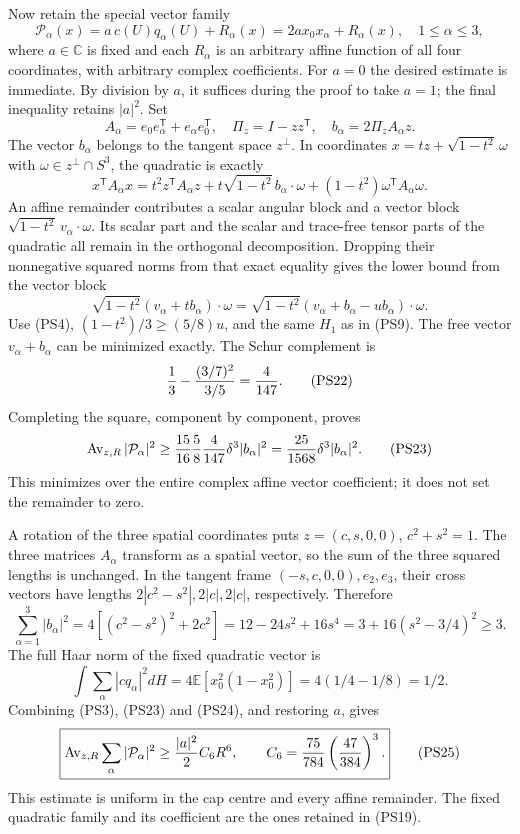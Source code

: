 \documentclass[11pt]{article}
\begin{document}
Now retain the special vector family
\[
 \mathcal P_\alpha(x)=a\,c(U)q_\alpha(U)+R_\alpha(x)
                   =2a x_0x_\alpha+R_\alpha(x),\quad 1\le\alpha\le3,
 \tag{PS19}
\]
where \(a\in\mathbb C\) is fixed and each \(R_\alpha\) is an
arbitrary affine function of all four coordinates, with arbitrary
complex coefficients. For \(a=0\) the desired estimate is immediate.
By division by \(a\), it suffices during the proof to take \(a=1\);
the final inequality retains \(|a|^2\).
Set
\[
 A_\alpha=e_0e_\alpha^{\mathsf T}+e_\alpha e_0^{\mathsf T},
 \quad \Pi_z=I-zz^{\mathsf T},\quad
 b_\alpha=2\Pi_zA_\alpha z.
 \tag{PS20}
\]
The vector \(b_\alpha\) belongs to the tangent space \(z^\perp\).
In coordinates \(x=t z+\sqrt{1-t^2}\,\omega\) with
\(\omega\in z^\perp\cap S^3\), the quadratic is exactly
\[
 x^{\mathsf T}A_\alpha x
 =t^2z^{\mathsf T}A_\alpha z+
 t\sqrt{1-t^2}\,b_\alpha\cdot\omega
 +(1-t^2)\omega^{\mathsf T}A_\alpha\omega.
 \tag{PS21}
\]
An affine remainder contributes a scalar angular block and a vector
block \(\sqrt{1-t^2}\,v_\alpha\cdot\omega\). Its scalar part and
the scalar and trace-free tensor parts of the quadratic all remain
in the orthogonal decomposition. Dropping their nonnegative squared
norms from that exact equality gives the lower bound from the vector
block
\[
 \sqrt{1-t^2}(v_\alpha+t b_\alpha)\cdot\omega
 =\sqrt{1-t^2}(v_\alpha+b_\alpha-u b_\alpha)\cdot\omega.
\]
Use (PS4), \((1-t^2)/3\ge(5/8)u\), and the same \(H_1\) as
in (PS9). The free vector \(v_\alpha+b_\alpha\) can be minimized
exactly. The Schur complement is
\[
 {1\over3}-{(3/7)^2\over3/5}={4\over147}.
 \tag{PS22}
\]
Completing the square, component by component, proves
\[
 \operatorname{Av}_{z,R}|\mathcal P_\alpha|^2
 \ge {15\over16}{5\over8}{4\over147}\delta^3|b_\alpha|^2
 ={25\over1568}\delta^3|b_\alpha|^2.
 \tag{PS23}
\]
This minimizes over the entire complex affine vector coefficient;
it does not set the remainder to zero.

A rotation of the three spatial coordinates puts
\(z=(c,s,0,0)\), \(c^2+s^2=1\). The three matrices \(A_\alpha\)
transform as a spatial vector, so the sum of the three squared
lengths is unchanged. In the tangent frame
\((-s,c,0,0),e_2,e_3\), their cross vectors have lengths
\(2|c^2-s^2|,2|c|,2|c|\), respectively. Therefore
\[
 \sum_{\alpha=1}^3|b_\alpha|^2
 =4[(c^2-s^2)^2+2c^2]
 =12-24s^2+16s^4
 =3+16(s^2-3/4)^2\ge3.
 \tag{PS24}
\]
The full Haar norm of the fixed quadratic vector is
\[
 \int\sum_\alpha|cq_\alpha|^2dH
 =4\mathbb E[x_0^2(1-x_0^2)]=4(1/4-1/8)=1/2.
 \]
Combining (PS3), (PS23) and (PS24), and restoring \(a\), gives
\[
 \boxed{\operatorname{Av}_{z,R}\sum_\alpha|\mathcal P_\alpha|^2
 \ge {|a|^2\over2}C_6R^6,\qquad
 C_6={75\over784}\left({47\over384}\right)^3.}
 \tag{PS25}
\]
This estimate is uniform in the cap centre and every affine
remainder. The fixed quadratic family and its coefficient are the
ones retained in (PS19).
\end{document}
